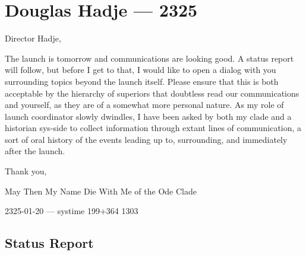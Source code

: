 \hypertarget{douglas-hadje-2325}{%
\chapter{Douglas Hadje — 2325}\label{douglas-hadje-2325}}

Director Hadje,

The launch is tomorrow and communications are looking good. A status report will follow, but before I get to that, I would like to open a dialog with you surrounding topics beyond the launch itself. Please ensure that this is both acceptable by the hierarchy of superiors that doubtless read our communications and yourself, as they are of a somewhat more personal nature. As my role of launch coordinator slowly dwindles, I have been asked by both my clade and a historian sys-side to collect information through extant lines of communication, a sort of oral history of the events leading up to, surrounding, and immediately after the launch.

Thank you,

May Then My Name Die With Me of the Ode Clade

2325-01-20 — systime 199+364 1303

\hypertarget{status-report}{%
\section{Status Report}\label{status-report}}

